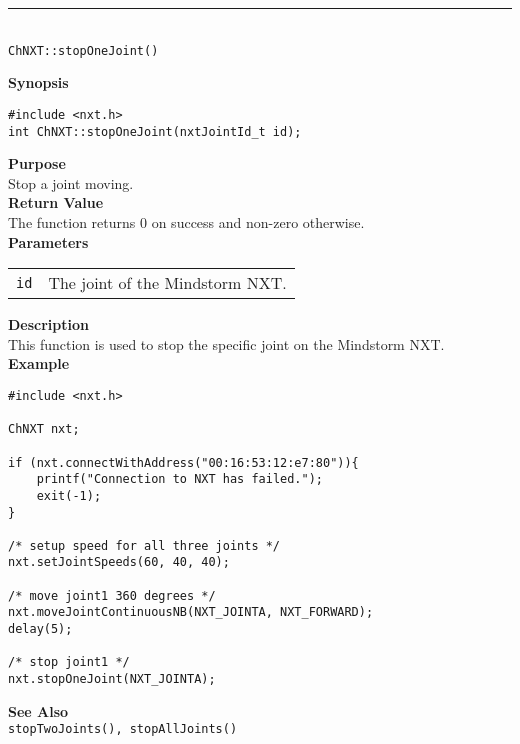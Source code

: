 \noindent
\vspace{5pt}
\rule{4.5in}{0.015in}\\
\noindent
{\LARGE \texttt{ChNXT::stopOneJoint()} }\\


\noindent
{\bf Synopsis}
\begin{lstlisting}
#include <nxt.h>
int ChNXT::stopOneJoint(nxtJointId_t id);
\end{lstlisting}

\noindent
{\bf Purpose}\\
Stop a joint moving.\\

\noindent
{\bf Return Value}\\
The function returns 0 on success and non-zero otherwise.\\

\noindent
{\bf Parameters}\\
\vspace{-0.1in}
\begin{description}
\item
\begin{tabular}{ p{20mm}p{135mm} }
\texttt{id}       &The joint of the Mindstorm NXT.\\
\end{tabular}
\end{description}

\noindent
{\bf Description}\\
This function is used to stop the specific joint on the Mindstorm NXT.\\

\noindent
{\bf Example}
\begin{lstlisting}
#include <nxt.h> 

ChNXT nxt;

if (nxt.connectWithAddress("00:16:53:12:e7:80")){
    printf("Connection to NXT has failed.");
    exit(-1);
}
    
/* setup speed for all three joints */
nxt.setJointSpeeds(60, 40, 40);

/* move joint1 360 degrees */
nxt.moveJointContinuousNB(NXT_JOINTA, NXT_FORWARD);
delay(5);

/* stop joint1 */
nxt.stopOneJoint(NXT_JOINTA);
\end{lstlisting}

\noindent
{\bf See Also}\\
\texttt{stopTwoJoints(), stopAllJoints()}\\
